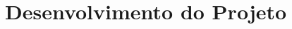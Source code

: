 \hypertarget{__RefHeading___Toc4804_37900007992}{}
\hypertarget{_Toc45627144}{}
\section{Desenvolvimento do Projeto}
\label{ages-i:text-h-0007}
